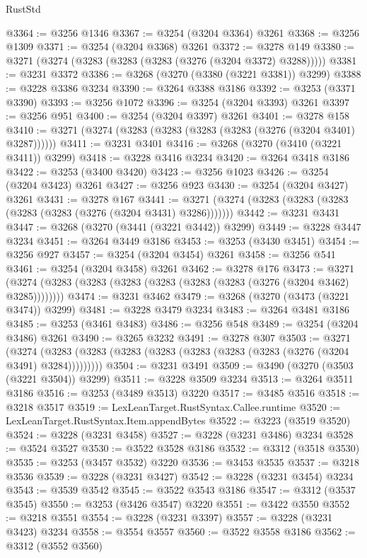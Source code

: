 \begin{lexlean}{RustStd}
\begin{coremodule}
{\begin{coremodule}
{{{{{{{{{{{{{{{{{{{{{{{{{{{{{{{{{{{{{@3364 := @3256 @1346
@3367 := @3254 (@3204 @3364) @3261
@3368 := @3256 @1309
@3371 := @3254 (@3204 @3368) @3261
@3372 := @3278 @149
@3380 := @3271 (@3274 (@3283 (@3283 (@3283 (@3276 (@3204 @3372) @3288)))))
@3381 := @3231 @3372
@3386 := @3268 (@3270 (@3380 (@3221 @3381)) @3299)
@3388 := @3228 @3386 @3234
@3390 := @3264 @3388 @3186
@3392 := @3253 (@3371 @3390)
@3393 := @3256 @1072
@3396 := @3254 (@3204 @3393) @3261
@3397 := @3256 @951
@3400 := @3254 (@3204 @3397) @3261
@3401 := @3278 @158
@3410 := @3271 (@3274 (@3283 (@3283 (@3283 (@3283 (@3276 (@3204 @3401) @3287))))))
@3411 := @3231 @3401
@3416 := @3268 (@3270 (@3410 (@3221 @3411)) @3299)
@3418 := @3228 @3416 @3234
@3420 := @3264 @3418 @3186
@3422 := @3253 (@3400 @3420)
@3423 := @3256 @1023
@3426 := @3254 (@3204 @3423) @3261
@3427 := @3256 @923
@3430 := @3254 (@3204 @3427) @3261
@3431 := @3278 @167
@3441 := @3271 (@3274 (@3283 (@3283 (@3283 (@3283 (@3283 (@3276 (@3204 @3431) @3286)))))))
@3442 := @3231 @3431
@3447 := @3268 (@3270 (@3441 (@3221 @3442)) @3299)
@3449 := @3228 @3447 @3234
@3451 := @3264 @3449 @3186
@3453 := @3253 (@3430 @3451)
@3454 := @3256 @927
@3457 := @3254 (@3204 @3454) @3261
@3458 := @3256 @541
@3461 := @3254 (@3204 @3458) @3261
@3462 := @3278 @176
@3473 := @3271 (@3274 (@3283 (@3283 (@3283 (@3283 (@3283 (@3283 (@3276 (@3204 @3462) @3285))))))))
@3474 := @3231 @3462
@3479 := @3268 (@3270 (@3473 (@3221 @3474)) @3299)
@3481 := @3228 @3479 @3234
@3483 := @3264 @3481 @3186
@3485 := @3253 (@3461 @3483)
@3486 := @3256 @548
@3489 := @3254 (@3204 @3486) @3261
@3490 := @3265 @3232
@3491 := @3278 @307
@3503 := @3271
    (@3274 (@3283 (@3283 (@3283 (@3283 (@3283 (@3283 (@3283 (@3276 (@3204 @3491) @3284)))))))))
@3504 := @3231 @3491
@3509 := @3490 (@3270 (@3503 (@3221 @3504)) @3299)
@3511 := @3228 @3509 @3234
@3513 := @3264 @3511 @3186
@3516 := @3253 (@3489 @3513) @3220
@3517 := @3485 @3516
@3518 := @3218 @3517
@3519 := LexLeanTarget.RustSyntax.Callee.runtime
@3520 := LexLeanTarget.RustSyntax.Item.appendBytes
@3522 := @3223 (@3519 @3520)
@3524 := @3228 (@3231 @3458)
@3527 := @3228 (@3231 @3486) @3234
@3528 := @3524 @3527
@3530 := @3522 @3528 @3186
@3532 := @3312 (@3518 @3530)
@3535 := @3253 (@3457 @3532) @3220
@3536 := @3453 @3535
@3537 := @3218 @3536
@3539 := @3228 (@3231 @3427)
@3542 := @3228 (@3231 @3454) @3234
@3543 := @3539 @3542
@3545 := @3522 @3543 @3186
@3547 := @3312 (@3537 @3545)
@3550 := @3253 (@3426 @3547) @3220
@3551 := @3422 @3550
@3552 := @3218 @3551
@3554 := @3228 (@3231 @3397)
@3557 := @3228 (@3231 @3423) @3234
@3558 := @3554 @3557
@3560 := @3522 @3558 @3186
@3562 := @3312 (@3552 @3560)
}}}}}}}}}}}}}}}}}}}}}}}}}}}}}}}}}}}}}
\end{coremodule}}
\end{coremodule}
\end{lexlean}
